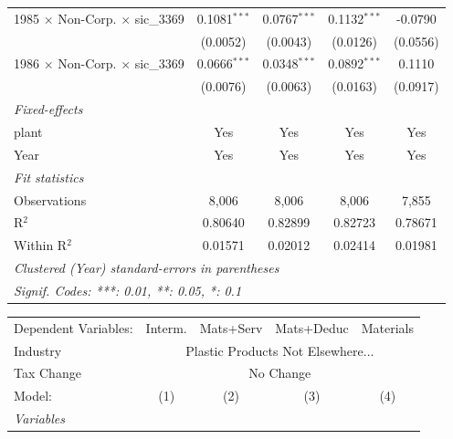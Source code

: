 \documentclass[
  12pt]{article}
\theoremstyle{definition}
\theoremstyle{remark}
\begin{document}
\begin{table}
\begin{minipage}{\linewidth}
\begin{tabular}{lcccc}
   1985 $\times$ Non-Corp. $\times$ sic\_3369    & 0.1081$^{***}$ & 0.0767$^{***}$ & 0.1132$^{***}$ & -0.0790\\   
                                                 & (0.0052)       & (0.0043)       & (0.0126)       & (0.0556)\\   
   1986 $\times$ Non-Corp. $\times$ sic\_3369    & 0.0666$^{***}$ & 0.0348$^{***}$ & 0.0892$^{***}$ & 0.1110\\   
                                                 & (0.0076)       & (0.0063)       & (0.0163)       & (0.0917)\\   
   \midrule
   \emph{Fixed-effects}\\
   plant                                         & Yes            & Yes            & Yes            & Yes\\  
   Year                                          & Yes            & Yes            & Yes            & Yes\\  
   \midrule
   \emph{Fit statistics}\\
   Observations                                  & 8,006          & 8,006          & 8,006          & 7,855\\  
   R$^2$                                         & 0.80640        & 0.82899        & 0.82723        & 0.78671\\  
   Within R$^2$                                  & 0.01571        & 0.02012        & 0.02414        & 0.01981\\  
   \midrule \midrule
   \multicolumn{5}{l}{\emph{Clustered (Year) standard-errors in parentheses}}\\
   \multicolumn{5}{l}{\emph{Signif. Codes: ***: 0.01, **: 0.05, *: 0.1}}\\
\end{tabular}
\par\endgroup
\begingroup
\centering
\begin{tabular}{lcccc}
   \tabularnewline \midrule \midrule
   Dependent Variables:                          & Interm.        & Mats+Serv      & Mats+Deduc     & Materials\\  
   Industry & \multicolumn{4}{c}{Plastic Products Not Elsewhere...} \\ 
   Tax Change & \multicolumn{4}{c}{No Change} \\ 
   Model:                                        & (1)            & (2)            & (3)            & (4)\\  
   \midrule
   \emph{Variables}\\

\end{tabular}
\end{minipage}
\end{table}
\end{document}
